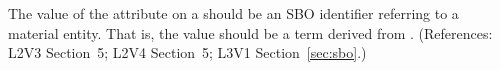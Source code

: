 The value of the  attribute on a \Species should be an SBO
identifier referring to a material entity.  That is, the value
should be a term derived from \sbomaterialentity.  (References: 
L2V3 Section~5; L2V4 Section~5; L3V1 Section~\ref{sec:sbo}.)
